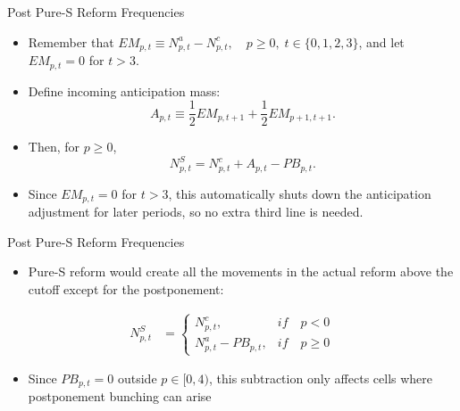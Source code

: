 \begin{frame}[label=pureS]{Post Pure-S Reform Frequencies}
    \begin{itemize}
        \item Remember that $EM_{p,t}\equiv N^a_{p,t}-N^c_{p,t},
        \quad p\geq 0,\; t\in\{0,1,2,3\}$, and let $EM_{p,t}=0$ for $t>3$.

        \item Define incoming anticipation mass:
        \[
        A_{p,t}\equiv \frac12 EM_{p,t+1}+\frac12 EM_{p+1,t+1}.
        \]
        \item Then, for $p\geq 0$,
        \[
        N^S_{p,t}=N^c_{p,t}+A_{p,t}-PB_{p,t}.
        \]
         \item Since $EM_{p,t}=0$ for $t>3$, this automatically shuts down the anticipation adjustment for later periods, so no extra third line is needed.
    \end{itemize}
\end{frame}

\begin{frame}{Post Pure-S Reform Frequencies}
    \begin{itemize}
        \item Pure-S reform would create all the movements in the actual reform above the cutoff except for the postponement:
    \end{itemize}
    \begin{align*}
            N^S_{p,t}&=\begin{cases}
                N_{p,t}^c, & if\quad p<0 \\
                N_{p,t}^a - PB_{p,t}, & if\quad p\geq 0
            \end{cases}
        \end{align*}
    \begin{itemize}
        \item Since $PB_{p,t}=0$ outside $p\in[0,4)$, this subtraction only affects cells where postponement bunching can arise
    \end{itemize}
\end{frame}

